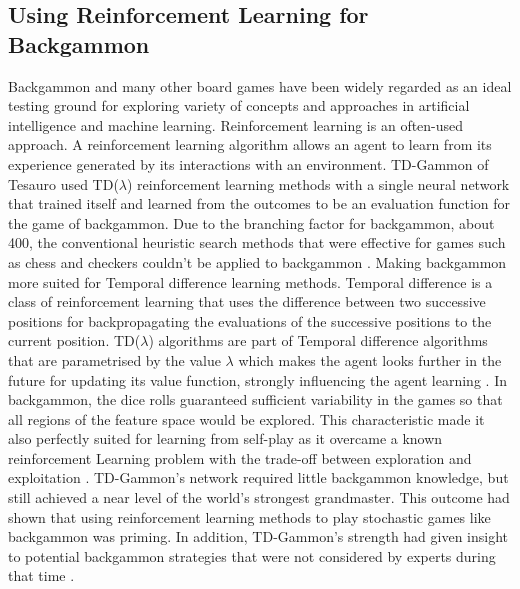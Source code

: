\documentclass[12pt,a4paper]{article}
\begin{document}
\subsection{Using Reinforcement Learning for Backgammon}
Backgammon and many other board games have been widely regarded as an ideal testing ground for exploring variety of concepts and approaches in artificial intelligence and machine learning. Reinforcement learning is an often-used approach. A reinforcement learning algorithm allows an agent to learn from its experience generated by its interactions with an environment. TD-Gammon of Tesauro \citeyear{DBLP:conf/icml/Tesauro92} used TD($\lambda$) reinforcement learning methods with a single neural network that trained itself and learned from the outcomes to be an evaluation function for the game of backgammon. Due to the branching factor for backgammon, about 400, the conventional heuristic search methods that were effective for games such as chess and checkers couldn't be applied to backgammon \cite{rl}. Making backgammon more suited for Temporal difference learning methods. Temporal difference is a class of reinforcement learning that uses the difference between two successive positions for backpropagating the evaluations of the successive positions to the current position. TD($\lambda$) algorithms are part of Temporal difference algorithms that are parametrised by the value $\lambda$ which makes the agent looks further in the future for updating its value function, strongly influencing the agent learning \cite{rl}. In backgammon, the dice rolls guaranteed sufficient variability in the games so that all regions of the feature space would be explored. This characteristic made it also perfectly suited for learning from self-play as it overcame a known reinforcement Learning problem with the trade-off between exploration and exploitation \cite{survey}. TD-Gammon's network required little backgammon knowledge, but still achieved a near level of the world's strongest grandmaster. This outcome had shown that using reinforcement learning methods to play stochastic games like backgammon was priming. In addition, TD-Gammon's strength had given insight to potential backgammon strategies that were not considered by experts during that time \cite{rl}. 
\end{document}
